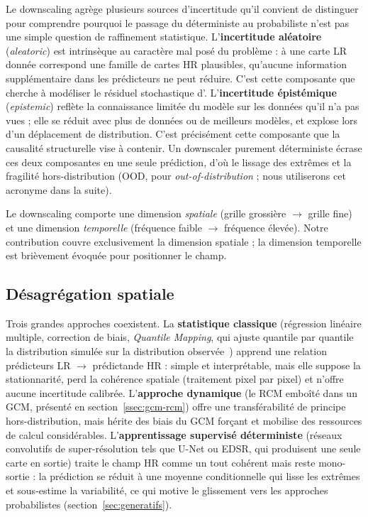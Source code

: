 Le downscaling agrège plusieurs sources d'incertitude qu'il convient de distinguer pour comprendre pourquoi le passage du déterministe au probabiliste n'est pas une simple question de raffinement statistique. L'\textbf{incertitude aléatoire} (\emph{aleatoric}) est intrinsèque au caractère mal posé du problème : à une carte LR donnée correspond une famille de cartes HR plausibles, qu'aucune information supplémentaire dans les prédicteurs ne peut réduire. C'est cette composante que cherche à modéliser le résiduel stochastique d'\Oracle{}. L'\textbf{incertitude épistémique} (\emph{epistemic}) reflète la connaissance limitée du modèle sur les données qu'il n'a pas vues ; elle se réduit avec plus de données ou de meilleurs modèles, et explose lors d'un déplacement de distribution. C'est précisément cette composante que la causalité structurelle vise à contenir. Un downscaler purement déterministe écrase ces deux composantes en une seule prédiction, d'où le lissage des extrêmes et la fragilité hors-distribution (OOD, pour \emph{out-of-distribution} ; nous utiliserons cet acronyme dans la suite).

\label{sec:classiques}

Le downscaling comporte une dimension \emph{spatiale} (grille grossière $\to$ grille fine) et une dimension \emph{temporelle} (fréquence faible $\to$ fréquence élevée). Notre contribution couvre exclusivement la dimension spatiale ; la dimension temporelle est brièvement évoquée pour positionner le champ.

\subsection{Désagrégation spatiale}
\label{ssec:disagg-spatiale}

Trois grandes approches coexistent. La \textbf{statistique classique} (régression linéaire multiple, correction de biais, \emph{Quantile Mapping}, qui ajuste quantile par quantile la distribution simulée sur la distribution observée~\cite{maraun_widmann_2018}) apprend une relation prédicteurs LR $\to$ prédictande HR : simple et interprétable, mais elle suppose la stationnarité, perd la cohérence spatiale (traitement pixel par pixel) et n'offre aucune incertitude calibrée. L'\textbf{approche dynamique} (le RCM emboîté dans un GCM, présenté en section~\ref{ssec:gcm-rcm}) offre une transférabilité de principe hors-distribution, mais hérite des biais du GCM forçant et mobilise des ressources de calcul considérables. L'\textbf{apprentissage supervisé déterministe} (réseaux convolutifs de super-résolution tels que U-Net ou EDSR, qui produisent une seule carte en sortie) traite le champ HR comme un tout cohérent mais reste mono-sortie : la prédiction se réduit à une moyenne conditionnelle qui lisse les extrêmes et sous-estime la variabilité, ce qui motive le glissement vers les approches probabilistes (section~\ref{sec:generatifs}).

